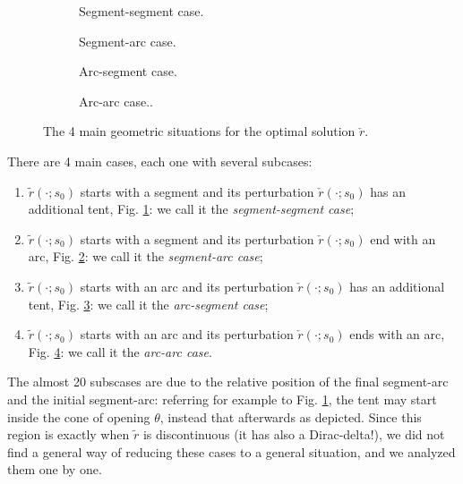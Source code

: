 \documentclass[reqno]{amsart}
\theoremstyle{definition} \newtheorem{definition}{Definition}[section]
\theoremstyle{definition} \newtheorem{remark}[definition]{Remark}
\theoremstyle{plain} \newtheorem{lemma}[definition]{Lemma}
\theoremstyle{plain} \newtheorem{proposition}[definition]{Proposition}
\theoremstyle{plain} \newtheorem{theorem}[definition]{Theorem}
\theoremstyle{plain} \newtheorem{corollary}[definition]{Corollary}
\theoremstyle{definition} \newtheorem{example}[definition]{Example}
\theoremstyle{plain} \newtheorem{claim}[clai]{Claim}
\theoremstyle{definition} \newtheorem{assumption}[definition]{Assumption}
\theoremstyle{definition} \newtheorem{observation}[definition]{Observation}
\newcommand{\1}{\mathbbm 1}
\numberwithin{equation}{section} %
\theoremstyle{plain} \newtheorem*{theorem*}{Theorem}
\theoremstyle{plain} \newtheorem{mthm}[maintheorem]{Main Theorem}
\theoremstyle{plain} \newtheorem*{mthm*}{Main Theorem}
\theoremstyle{plain} \newtheorem*{conjecture*}{Conjecture}
\theoremstyle{plain} \newtheorem{conjecture}[definition]{Conjecture}
\theoremstyle{plain} \newtheorem*{problem*}{Problem}
\begin{document}
\begin{figure}
\begin{subfigure}{.475\textwidth}
\resizebox{\textwidth}{!}{}
\caption{Segment-segment case.}
\label{Fig:deltacheckr_1}
\end{subfigure} \hfill
\begin{subfigure}{.475\textwidth}
\resizebox{\textwidth}{!}{}
\caption{Segment-arc case.}
\label{Fig:deltacheckr_2}
\end{subfigure}
\begin{subfigure}{.475\textwidth}
\resizebox{\textwidth}{!}{}
\caption{Arc-segment case.}
\label{Fig:deltacheckr_3}
\end{subfigure} \hfill
\begin{subfigure}{.475\textwidth}
\resizebox{\textwidth}{!}{}
\caption{Arc-arc case..}
\label{Fig:deltacheckr_4}
\end{subfigure}
\caption{The 4 main geometric situations for the optimal solution $\check r$.}
\label{Fig:deltacheckr}
\end{figure}

There are 4 main cases, each one with several subcases:
\begin{enumerate}
\item $\tilde r(\cdot;s_0)$ starts with a segment and its perturbation $\check r(\cdot;s_0)$ has an additional tent, Fig. \ref{Fig:deltacheckr_1}: we call it the \emph{segment-segment case};
\item $\tilde r(\cdot;s_0)$ starts with a segment and its perturbation $\check r(\cdot;s_0)$ end with an arc, Fig. \ref{Fig:deltacheckr_2}: we call it the \emph{segment-arc case};
\item $\tilde r(\cdot;s_0)$ starts with an arc and its perturbation $\check r(\cdot;s_0)$ has an additional tent, Fig. \ref{Fig:deltacheckr_3}: we call it the \emph{arc-segment case};
\item $\tilde r(\cdot;s_0)$ starts with an arc and its perturbation $\check r(\cdot;s_0)$ ends with an arc, Fig. \ref{Fig:deltacheckr_4}: we call it the \emph{arc-arc case}.
\end{enumerate}

The almost 20 subscases are due to the relative position of the final segment-arc and the initial segment-arc: referring for example to Fig. \ref{Fig:deltacheckr_1}, the tent may start inside the cone of opening $\theta$, instead that afterwards as depicted. Since this region is exactly when $\tilde r$ is discontinuous (it has also a Dirac-delta!), we did not find a general way of reducing these cases to a general situation, and we analyzed them one by one.
\end{document}
